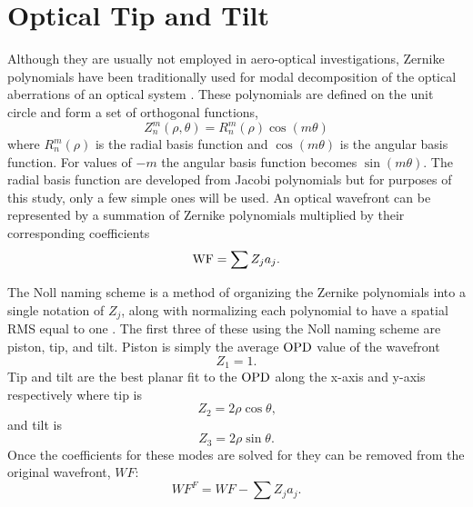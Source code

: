 \section{Optical Tip and Tilt}
Although they are usually not employed in aero-optical investigations, Zernike polynomials have been traditionally used for modal decomposition of the optical aberrations of an optical system \cite{Born-1965-HHGYgjdH}.
These polynomials are defined on the unit circle and form a set of orthogonal functions,
\begin{equation}
  Z_n^m(\rho,\theta) = R_n^m(\rho)\cos(m\theta)
  \label{eqn:07_zernike}
\end{equation}
where $R_n^m(\rho)$ is the radial basis function and $\cos(m\theta)$ is the angular basis function.
For values of $-m$ the angular basis function becomes $\sin(m\theta)$.
The radial basis function are developed from Jacobi polynomials but for purposes of this study, only a few simple ones will be used.
An optical wavefront can be represented by a summation of Zernike polynomials multiplied by their corresponding coefficients
\begin{equation}
  \operatorname{WF} = \sum Z_ja_j \textrm{.}
  \label{eqn:07_zernike_coeff}
\end{equation}

The Noll naming scheme is a method of organizing the Zernike polynomials into a single notation of $Z_j$, along with normalizing each polynomial to have a spatial RMS equal to one \cite{Noll-1976-HHKzd88f}.
The first three of these using the Noll naming scheme are piston, tip, and tilt.
Piston is simply the average $\operatorname{OPD}$ value of the wavefront
\begin{equation}
  Z_1 = 1 \textrm{.}
  \label{eqn:07_zernike_1}
\end{equation}
Tip and tilt are the best planar fit to the $\operatorname{OPD}$ along the x-axis and y-axis respectively where tip is
\begin{equation}
  Z_2 = 2\rho\cos\theta \textrm{,}
  \label{eqn:07_zernike_2}
\end{equation}
and tilt is
\begin{equation}
  Z_3 = 2\rho\sin\theta \textrm{.}
  \label{eqn:07_zernike_3}
\end{equation}
Once the coefficients for these modes are solved for they can be removed from the original wavefront, $WF$:
\begin{equation}
  WF^F = WF-\sum Z_ja_j \textrm{.}
\end{equation}

